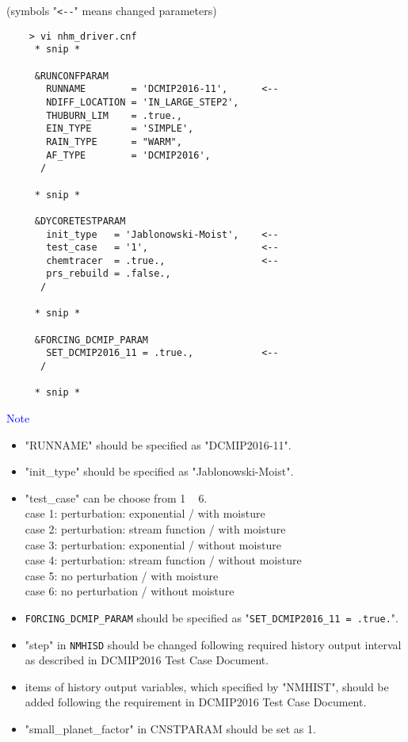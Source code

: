 \documentclass[a4paper]{article}
\begin{document}
 \vspace{0.5cm}

 (symbols "\verb|<--|" means changed parameters)
 \begin{verbatim}
    > vi nhm_driver.cnf
     * snip *

     &RUNCONFPARAM
       RUNNAME        = 'DCMIP2016-11',      <--
       NDIFF_LOCATION = 'IN_LARGE_STEP2',
       THUBURN_LIM    = .true.,
       EIN_TYPE       = 'SIMPLE',
       RAIN_TYPE      = "WARM",
       AF_TYPE        = 'DCMIP2016',
      /

     * snip *

     &DYCORETESTPARAM
       init_type   = 'Jablonowski-Moist',    <--
       test_case   = '1',                    <--
       chemtracer  = .true.,                 <--
       prs_rebuild = .false.,
      /

     * snip *

     &FORCING_DCMIP_PARAM
       SET_DCMIP2016_11 = .true.,            <--
      /

     * snip *
 \end{verbatim}


 \noindent \textcolor{blue}{{\sf Note}}
 \begin{itemize}
   \item "RUNNAME" should be specified as "DCMIP2016-11".
   \item "init\_type" should be specified as "Jablonowski-Moist".
   \item "test\_case" can be choose from 1 ~ 6.\\
          case 1: perturbation: exponential / with moisture \\
          case 2: perturbation: stream function / with moisture \\
          case 3: perturbation: exponential / without moisture \\
          case 4: perturbation: stream function / without moisture \\
          case 5: no perturbation / with moisture \\
          case 6: no perturbation / without moisture
   \item \verb|FORCING_DCMIP_PARAM| should be specified as "\verb|SET_DCMIP2016_11 = .true.|".
   \item "step" in \verb|NMHISD| should be changed following required history output interval
           as described in DCMIP2016 Test Case Document.
   \item items of history output variables, which specified by "NMHIST", should be added
         following the requirement in DCMIP2016 Test Case Document.
   \item "small\_planet\_factor" in CNSTPARAM should be set as 1.
 \end{itemize}
\end{document}
